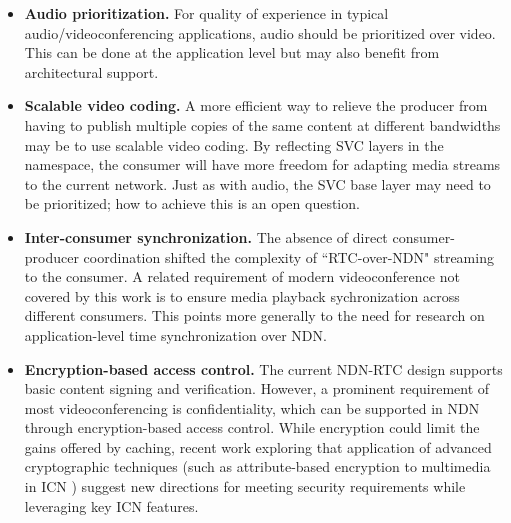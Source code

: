 \documentclass{icn/sig-alternate-2013} %
\newcommand{\ndnrtcName}{NDN-RTC} %
\begin{document}
\begin{itemize}[label={}]
\item \textbf{Audio prioritization.}  For quality of experience in typical audio/videoconferencing applications, audio should be prioritized over video.  This can be done at the application level but may also benefit from architectural support. %

\item \textbf{Scalable video coding.} A more efficient way to relieve the producer from having to publish multiple copies of the same content at different bandwidths may be to use scalable video coding. By reflecting SVC layers in the namespace, the consumer will have more freedom for adapting media streams to the current network. Just as with audio, the SVC base layer may need to be prioritized; how to achieve this is an open question.

\item \textbf{Inter-consumer synchronization.} The absence of direct consumer-producer coordination shifted the complexity of ``RTC-over-NDN" streaming to the consumer. A related requirement of modern videoconference not covered by this work is to ensure media playback sychronization across different consumers.   This points more generally to the need for research on application-level time synchronization over NDN. 

\item \textbf{Encryption-based access control.} The current \ndnrtcName{} design supports basic content signing and verification. However, a prominent requirement of most videoconferencing is confidentiality, which can be supported in NDN through encryption-based access control.  While encryption could limit the gains offered by caching, recent work exploring that application of advanced cryptographic techniques (such as attribute-based encryption to multimedia in ICN \cite{papanis2014use}) suggest new directions for meeting security requirements while leveraging key ICN features. 

\end{itemize}
\end{document}
